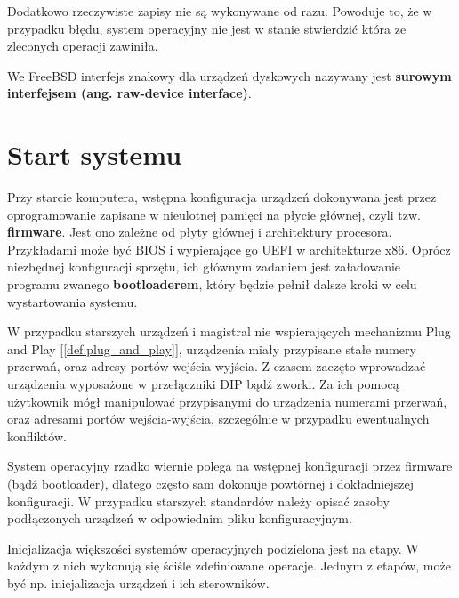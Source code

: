 \documentclass[shortabstract,inz]{iithesis}
\begin{document}
Dodatkowo rzeczywiste zapisy nie są wykonywane od razu. Powoduje to, że w przypadku
błędu, system operacyjny nie jest w stanie stwierdzić która ze zleconych operacji zawiniła.

We FreeBSD interfejs znakowy dla urządzeń dyskowych nazywany jest 
\textbf{surowym interfejsem (ang. raw-device interface)}.
 
\section{Start systemu} %
\label{sec:start_systemu}


Przy starcie komputera, wstępna konfiguracja urządzeń dokonywana jest przez
oprogramowanie zapisane w nieulotnej pamięci na płycie głównej, 
czyli tzw. \textbf{firmware}. Jest ono zależne od płyty głównej i architektury procesora. 
Przykładami może być BIOS \cite{wiki:bios} i wypierające go UEFI \cite{uefi} w architekturze x86. 
Oprócz niezbędnej konfiguracji sprzętu,
ich głównym zadaniem jest załadowanie programu zwanego \textbf{bootloaderem}, który
będzie pełnił dalsze kroki w celu wystartowania systemu. 


W przypadku starszych urządzeń i magistral nie wspierających mechanizmu Plug and Play [\ref{def:plug_and_play}],
urządzenia miały przypisane stałe numery przerwań, oraz adresy portów wejścia-wyjścia.
Z czasem zaczęto wprowadzać urządzenia wyposażone w przełączniki DIP bądź zworki. Za ich
pomocą użytkownik mógł manipulować przypisanymi do urządzenia numerami przerwań, oraz
adresami portów wejścia-wyjścia, szczególnie w przypadku ewentualnych konfliktów.

System operacyjny rzadko wiernie polega na wstępnej konfiguracji przez firmware (bądź bootloader), 
dlatego często sam dokonuje powtórnej i dokładniejszej konfiguracji.
W przypadku starszych standardów należy opisać zasoby podłączonych urządzeń
w odpowiednim pliku konfiguracyjnym.

Inicjalizacja większości systemów operacyjnych podzielona jest na etapy.
W każdym z nich wykonują się ściśle zdefiniowane operacje. Jednym z etapów,
może być np. inicjalizacja urządzeń i ich sterowników.

\end{document}
